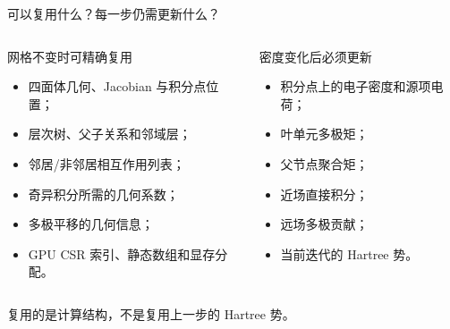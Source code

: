 \documentclass[aspectratio=169,11pt]{beamer}
\begin{document}
\begin{frame}{可以复用什么？每一步仍需更新什么？}
  \begin{columns}[T,onlytextwidth]
      \begin{block}{网格不变时可精确复用}
        \small
        \begin{itemize}\setlength\itemsep{0.33em}
          \item 四面体几何、Jacobian 与积分点位置；
          \item 层次树、父子关系和邻域层；
          \item 邻居/非邻居相互作用列表；
          \item 奇异积分所需的几何系数；
          \item 多极平移的几何信息；
          \item GPU CSR 索引、静态数组和显存分配。
        \end{itemize}
      \end{block}
      \begin{block}{密度变化后必须更新}
        \small
        \begin{itemize}\setlength\itemsep{0.48em}
          \item 积分点上的电子密度和源项电荷；
          \item 叶单元多极矩；
          \item 父节点聚合矩；
          \item 近场直接积分；
          \item 远场多极贡献；
          \item 当前迭代的 Hartree 势。
        \end{itemize}
      \end{block}
  \end{columns}

  \vspace{0.2cm}
  \centering\alert{复用的是计算结构，不是复用上一步的 Hartree 势。}
\end{frame}
\end{document}
